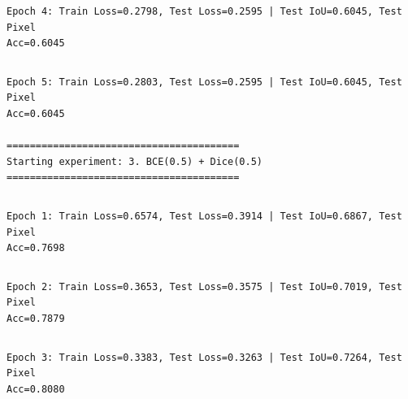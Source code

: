 \documentclass[11pt]{article}
\begin{document}
    \begin{Verbatim}[commandchars=\\\{\}]
Epoch 4: Train Loss=0.2798, Test Loss=0.2595 | Test IoU=0.6045, Test Pixel
Acc=0.6045
    \end{Verbatim}

    \begin{Verbatim}[commandchars=\\\{\}]

    \end{Verbatim}

    \begin{Verbatim}[commandchars=\\\{\}]
Epoch 5: Train Loss=0.2803, Test Loss=0.2595 | Test IoU=0.6045, Test Pixel
Acc=0.6045

========================================
Starting experiment: 3. BCE(0.5) + Dice(0.5)
========================================
    \end{Verbatim}

    \begin{Verbatim}[commandchars=\\\{\}]

    \end{Verbatim}

    \begin{Verbatim}[commandchars=\\\{\}]
Epoch 1: Train Loss=0.6574, Test Loss=0.3914 | Test IoU=0.6867, Test Pixel
Acc=0.7698
    \end{Verbatim}

    \begin{Verbatim}[commandchars=\\\{\}]

    \end{Verbatim}

    \begin{Verbatim}[commandchars=\\\{\}]
Epoch 2: Train Loss=0.3653, Test Loss=0.3575 | Test IoU=0.7019, Test Pixel
Acc=0.7879
    \end{Verbatim}

    \begin{Verbatim}[commandchars=\\\{\}]

    \end{Verbatim}

    \begin{Verbatim}[commandchars=\\\{\}]
Epoch 3: Train Loss=0.3383, Test Loss=0.3263 | Test IoU=0.7264, Test Pixel
Acc=0.8080
    \end{Verbatim}
\end{document}
